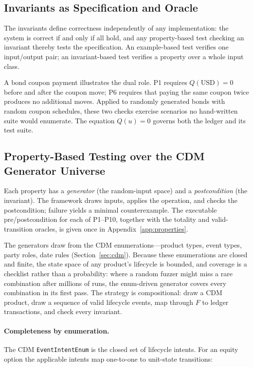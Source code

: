 \subsection{Invariants as Specification and Oracle}
\label{sec:sec15-spec}

The invariants define correctness independently of any implementation: the system is correct if and only if all hold, and any property-based test checking an invariant thereby tests the specification. An example-based test verifies one input/output pair; an invariant-based test verifies a property over a whole input class.

A bond coupon payment illustrates the dual role. P1 requires $Q(\mathrm{USD})=0$ before and after the coupon move; P6 requires that paying the same coupon twice produces no additional moves. Applied to randomly generated bonds with random coupon schedules, these two checks exercise scenarios no hand-written suite would enumerate. The equation $Q(u)=0$ governs both the ledger and its test suite.

\subsection{Property-Based Testing over the CDM Generator Universe}
\label{sec:sec15-pbt}

Each property has a \emph{generator} (the random-input space) and a \emph{postcondition} (the invariant). The framework draws inputs, applies the operation, and checks the postcondition; failure yields a minimal counterexample. The executable pre/postcondition for each of P1--P10, together with the totality and valid-transition oracles, is given once in Appendix~\ref{app:properties}.

The generators draw from the CDM enumerations---product types, event types, party roles, date rules (Section~\ref{sec:cdm}). Because these enumerations are closed and finite, the state space of any product's lifecycle is bounded, and coverage is a checklist rather than a probability: where a random fuzzer might miss a rare combination after millions of runs, the enum-driven generator covers every combination in its first pass. The strategy is compositional: draw a CDM product, draw a sequence of valid lifecycle events, map through $F$ to ledger transactions, and check every invariant.

\paragraph{Completeness by enumeration.} The CDM \texttt{EventIntentEnum} is the closed set of lifecycle intents. For an equity option the applicable intents map one-to-one to unit-state transitions:

